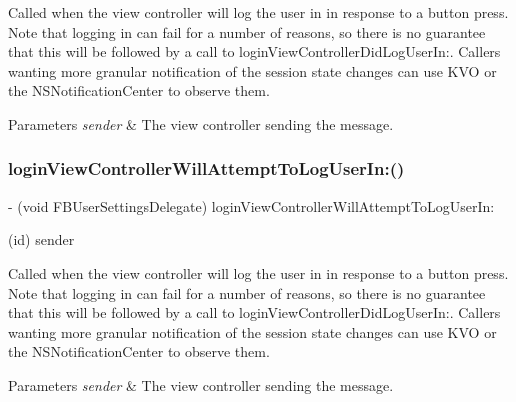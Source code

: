 Called when the view controller will log the user in in response to a button press. Note that logging in can fail for a number of reasons, so there is no guarantee that this will be followed by a call to login\+View\+Controller\+Did\+Log\+User\+In\+:. Callers wanting more granular notification of the session state changes can use K\+VO or the N\+S\+Notification\+Center to observe them.


\begin{DoxyParams}{Parameters}
{\em sender} & The view controller sending the message. \\
\hline
\end{DoxyParams}
\mbox{\label{protocolFBUserSettingsDelegate_01-p_a29fe822340933959a1b01785c50b7c4b}} 
\subsubsection{\texorpdfstring{login\+View\+Controller\+Will\+Attempt\+To\+Log\+User\+In\+:()}{loginViewControllerWillAttemptToLogUserIn:()}\hspace{0.1cm}{\footnotesize\ttfamily [5/5]}}
{\footnotesize\ttfamily -\/ (void F\+B\+User\+Settings\+Delegate) login\+View\+Controller\+Will\+Attempt\+To\+Log\+User\+In\+: \begin{DoxyParamCaption}\item[{(id)}]{sender }\end{DoxyParamCaption}\hspace{0.3cm}{\ttfamily [optional]}}

Called when the view controller will log the user in in response to a button press. Note that logging in can fail for a number of reasons, so there is no guarantee that this will be followed by a call to login\+View\+Controller\+Did\+Log\+User\+In\+:. Callers wanting more granular notification of the session state changes can use K\+VO or the N\+S\+Notification\+Center to observe them.


\begin{DoxyParams}{Parameters}
{\em sender} & The view controller sending the message. \\
\hline
\end{DoxyParams}
\mbox{\label{protocolFBUserSettingsDelegate_01-p_a194e956d188265f18ec887255d90b7c8}} 
